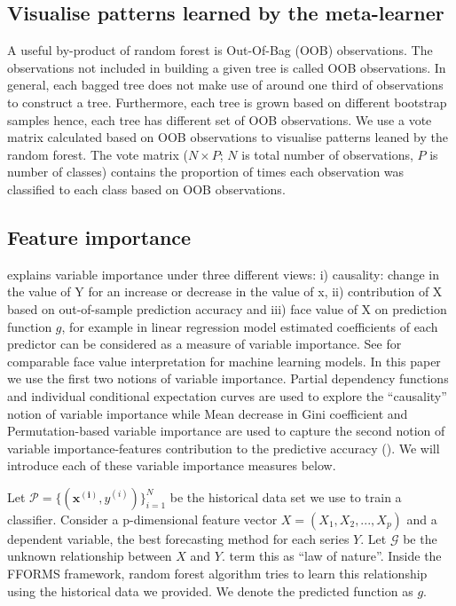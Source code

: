 \documentclass[11pt,a4paper,]{article}
\begin{document}
\hypertarget{visualise-patterns-learned-by-the-meta-learner}{%
\subsection{Visualise patterns learned by the meta-learner}\label{visualise-patterns-learned-by-the-meta-learner}}

A useful by-product of random forest is Out-Of-Bag (OOB) observations. The observations not included in building a given tree is called OOB observations. In general, each bagged tree does not make use of around one third of observations to construct a tree. Furthermore, each tree is grown based on different bootstrap samples hence, each tree has different set of OOB observations. We use a vote matrix calculated based on OOB observations to visualise patterns leaned by the random forest. The vote matrix (\(N \times P\); \(N\) is total number of observations, \(P\) is number of classes) contains the proportion of times each observation was classified to each class based on OOB observations.

\hypertarget{feature-importance}{%
\subsection{Feature importance}\label{feature-importance}}

\textcite{jiang2002} explains variable importance under three different views: i) causality: change in the value of Y for an increase or decrease in the value of x, ii) contribution of X based on out-of-sample prediction accuracy and iii) face value of X on prediction function \(g\), for example in linear regression model estimated coefficients of each predictor can be considered as a measure of variable importance. See \textcite{jiang2002} for comparable face value interpretation for machine learning models. In this paper we use the first two notions of variable importance. Partial dependency functions and individual conditional expectation curves are used to explore the ``causality'' notion of variable importance while Mean decrease in Gini coefficient and Permutation-based variable importance are used to capture the second notion of variable importance-features contribution to the predictive accuracy (\textcite{Zhao}). We will introduce each of these variable importance measures below.

Let \(\mathcal{P}=\{(\mathbf{x^{(i)}}, y^{(i)})\}_{i=1}^{N}\) be the
historical data set we use to train a classifier. Consider a
p-dimensional feature vector \(X=(X_1, X_2, ..., X_p)\) and a dependent
variable, the best forecasting method for each series \(Y\). Let \(\mathcal{G}\) be the unknown relationship between \(X\) and
\(Y\). \textcite{Zhao} term this as ``law of nature''. Inside the FFORMS framework, random forest algorithm tries to learn this relationship using
the historical data we provided. We denote the predicted function as
\(g\).
\end{document}
